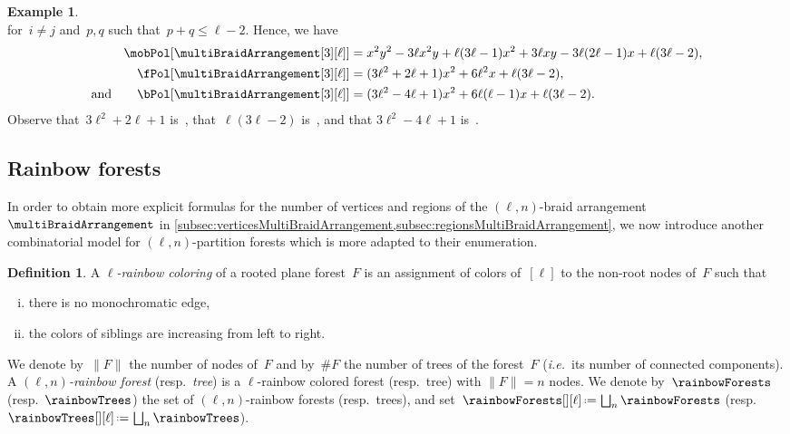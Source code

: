 \documentclass{amsart}
\newcommand{\darkblue}{\color{darkblue}} %
\newcommand{\vincenti}[1]{\todo[color=blue!30, inline]{\rm #1 \\ \hfill --- V.}}
\theoremstyle{definition}
\newtheorem{definition}[theorem]{Definition}
\newtheorem{example}[theorem]{Example}
\newcommand{\eqdef}{\mbox{\,\raisebox{0.2ex}{\scriptsize\ensuremath{\mathrm:}}\ensuremath{=}\,}} %
\newcommand{\ie}{\textit{i.e.}~} %
\newcommand{\resp}{resp.~} %
\newcommand{\defn}[1]{\textsl{\darkblue #1}} %
\newcommand{\OEIS}[1]{\cite[{\rm \href{http://oeis.org/#1}{\texttt{#1}}}]{OEIS}}
\begin{document}
\begin{example}
\[\]
for~$i \ne j$ and~$p, q$ such that~$p + q \le \ell-2$.
Hence, we have
\begin{align*}
\mobPol[{\multiBraidArrangement[3][\ell]}] & = x^2 y^2 - 3 \ell x^2 y + \ell (3 \ell - 1) x^2 + 3 \ell x y - 3 \ell (2 \ell - 1) x + \ell (3 \ell - 2) , \\
\fPol[{\multiBraidArrangement[3][\ell]}] & = (3 \ell^2 + 2 \ell + 1) x^2 + 6 \ell^2 x + \ell (3 \ell - 2), \\
\text{and}\qquad
\bPol[{\multiBraidArrangement[3][\ell]}] & = (3 \ell^2 - 4 \ell + 1) x^2 + 6 \ell (\ell - 1) x + \ell (3 \ell - 2).
\end{align*}
Observe that~$3 \ell^2 + 2 \ell + 1$ is~\OEIS{A056109}, that~$\ell (3 \ell - 2)$ is~\OEIS{A000567}, and that ${3 \ell^2 - 4 \ell + 1}$ is~\OEIS{A045944}.
\end{example}


\subsection{Rainbow forests}
\label{subsec:rainbowForests}

In order to obtain more explicit formulas for the number of vertices and regions of the $(\ell,n)$-braid arrangement~$\multiBraidArrangement$ in \cref{subsec:verticesMultiBraidArrangement,subsec:regionsMultiBraidArrangement}, we now introduce another combinatorial model for $(\ell,n)$-partition forests which is more adapted to their enumeration.

\begin{definition}
\label{def:rainbowForest}
A \defn{$\ell$-rainbow coloring} of a rooted plane forest~$F$ is an assignment of colors of~$[\ell]$ to the non-root nodes of~$F$ such that
\begin{enumerate}[(i)]
\item there is no monochromatic edge,
\item the colors of siblings are increasing from left to right.
\end{enumerate}
We denote by~$\|F\|$ the number of nodes of~$F$ and by~$\#F$ the number of trees of the forest~$F$ (\ie its number of connected components).
A \defn{$(\ell,n)$-rainbow forest} (\resp \defn{tree}) is a \mbox{$\ell$-rainbow} colored forest (\resp tree) with $\|F\| = n$ nodes.
We denote by~$\rainbowForests$ (\resp $\rainbowTrees$) the set of $(\ell,n)$-rainbow forests (\resp trees), and set~$\rainbowForests[][\ell] \eqdef \bigsqcup_n \rainbowForests$ (\resp $\rainbowTrees[][\ell] \eqdef \bigsqcup_n \rainbowTrees$).
\end{definition}
\end{document}
